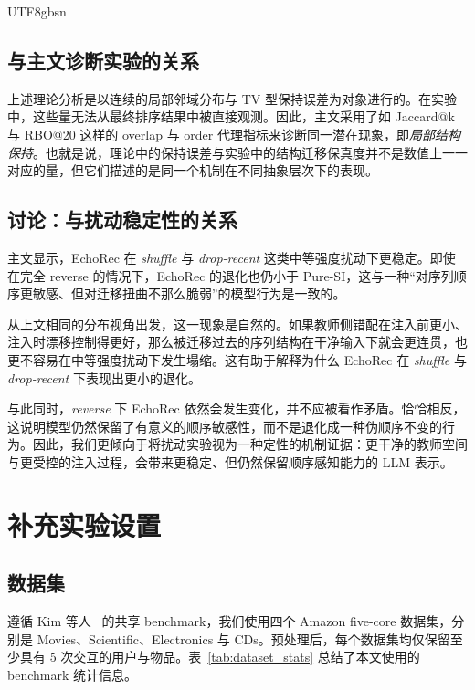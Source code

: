 \documentclass{article}
\begin{document}
\begin{CJK*}{UTF8}{gbsn}
\subsection{与主文诊断实验的关系}
\label{app:diagnosis_relation}

上述理论分析是以连续的局部邻域分布与 TV 型保持误差为对象进行的。在实验中，这些量无法从最终排序结果中被直接观测。因此，主文采用了如 Jaccard@k 与 RBO@20 这样的 overlap 与 order 代理指标来诊断同一潜在现象，即\emph{局部结构保持}。也就是说，理论中的保持误差与实验中的结构迁移保真度并不是数值上一一对应的量，但它们描述的是同一个机制在不同抽象层次下的表现。

\subsection{讨论：与扰动稳定性的关系}
\label{app:perturb_cor}

主文显示，EchoRec 在 \emph{shuffle} 与 \emph{drop-recent} 这类中等强度扰动下更稳定。即使在完全 reverse 的情况下，EchoRec 的退化也仍小于 Pure-SI，这与一种“对序列顺序更敏感、但对迁移扭曲不那么脆弱”的模型行为是一致的。

从上文相同的分布视角出发，这一现象是自然的。如果教师侧错配在注入前更小、注入时漂移控制得更好，那么被迁移过去的序列结构在干净输入下就会更连贯，也更不容易在中等强度扰动下发生塌缩。这有助于解释为什么 EchoRec 在 \emph{shuffle} 与 \emph{drop-recent} 下表现出更小的退化。

与此同时，\emph{reverse} 下 EchoRec 依然会发生变化，并不应被看作矛盾。恰恰相反，这说明模型仍然保留了有意义的顺序敏感性，而不是退化成一种伪顺序不变的行为。因此，我们更倾向于将扰动实验视为一种定性的机制证据：更干净的教师空间与更受控的注入过程，会带来更稳定、但仍然保留顺序感知能力的 LLM 表示。

\section{补充实验设置}
\label{app:exp_settings}

\subsection{数据集}
\label{app:datasets}

遵循 Kim 等人~\cite{kim2025lost} 的共享 benchmark，我们使用四个 Amazon five-core 数据集，分别是 Movies、Scientific、Electronics 与 CDs。预处理后，每个数据集均仅保留至少具有 5 次交互的用户与物品。表~\ref{tab:dataset_stats} 总结了本文使用的 benchmark 统计信息。


\end{CJK*}
\end{document}
